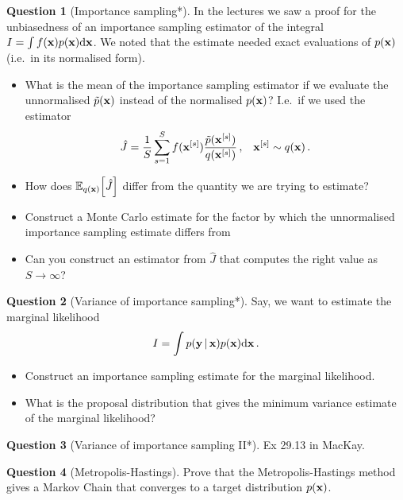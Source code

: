 \documentclass[a4paper]{article}
\theoremstyle{definition}
\newtheorem{question}{Question}
\begin{document}
\begin{question}[Importance sampling*]
\label{q:importance-sampling-unnormalised}
In the lectures we saw a proof for the unbiasedness of an importance sampling estimator of the integral $I = \int f(\mathbf{x}) p(\mathbf{x}) \mathrm{d}{\mathbf{x}}$. We noted that the estimate needed exact evaluations of $p(\mathbf{x})$ (i.e.~in its normalised form).
\begin{itemize}
\item What is the mean of the importance sampling estimator if we evaluate the unnormalised $\tilde p(\mathbf{x})$ instead of the normalised $p(\mathbf{x})$? I.e.~if we used the estimator
\begin{align}
\hat{J} = \frac{1}{S}\sum_{s=1}^S f(\mathbf{x}^{[s]}) \frac{\tilde p(\mathbf{x}^{[s]})}{q(\mathbf{x}^{[s]})} \,, && \mathbf{x}^{[s]} \sim q(\mathbf{x}) \,.
\end{align}
\item How does $\Exp{q(\vx)}{\hat J}$ differ from the quantity we are trying to estimate?
\item Construct a Monte Carlo estimate for the factor by which the unnormalised importance sampling estimate differs from 
\item Can you construct an estimator from $\hat J$ that computes the right value as $S \to \infty$?
\end{itemize}
\end{question}


\begin{question}[Variance of importance sampling*]
\label{q:importance-sampling-variance}
Say, we want to estimate the marginal likelihood
\begin{align}
I = \int p(\mathbf{y}\,|\,\mathbf{x}) p(\mathbf{x})\mathrm{d}{\mathbf{x}} \,.
\end{align}
\begin{itemize}
\item Construct an importance sampling estimate for the marginal likelihood.
\item What is the proposal distribution that gives the minimum variance estimate of the marginal likelihood?
\end{itemize}
\end{question}


\begin{question}[Variance of importance sampling II*]
\label{q:importance-sampling-variance-2}
Ex 29.13 in MacKay.
\end{question}


\begin{question}[Metropolis-Hastings]
Prove that the Metropolis-Hastings method gives a Markov Chain that converges to a target distribution $p(\mathbf{x})$.
\end{question}
\end{document}
